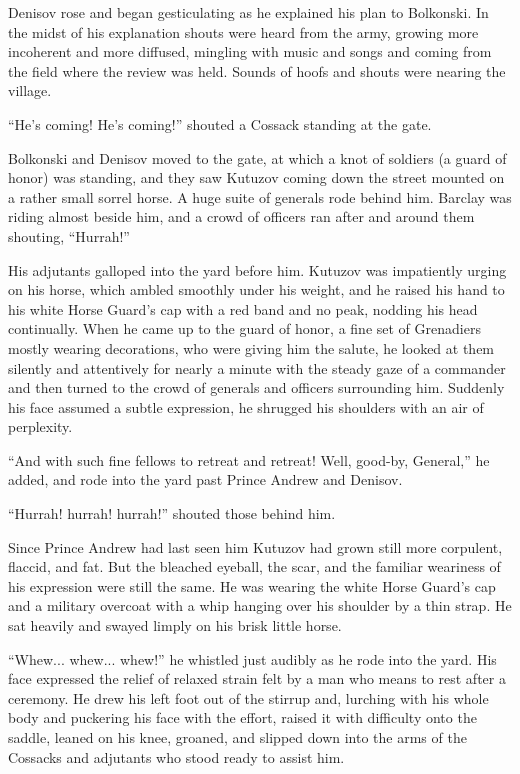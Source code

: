 Denisov rose and began gesticulating as he explained his plan to
Bolkonski. In the midst of his explanation shouts were heard from
the army, growing more incoherent and more diffused, mingling
with music and songs and coming from the field where the review
was held. Sounds of hoofs and shouts were nearing the village.

``He's coming! He's coming!'' shouted a Cossack standing at the
gate.

Bolkonski and Denisov moved to the gate, at which a knot of
soldiers (a guard of honor) was standing, and they saw Kutuzov
coming down the street mounted on a rather small sorrel horse. A
huge suite of generals rode behind him. Barclay was riding almost
beside him, and a crowd of officers ran after and around them
shouting, ``Hurrah!''

His adjutants galloped into the yard before him. Kutuzov was
impatiently urging on his horse, which ambled smoothly under his
weight, and he raised his hand to his white Horse Guard's cap
with a red band and no peak, nodding his head continually. When
he came up to the guard of honor, a fine set of Grenadiers mostly
wearing decorations, who were giving him the salute, he looked at
them silently and attentively for nearly a minute with the steady
gaze of a commander and then turned to the crowd of generals and
officers surrounding him. Suddenly his face assumed a subtle
expression, he shrugged his shoulders with an air of perplexity.

``And with such fine fellows to retreat and retreat! Well,
good-by, General,'' he added, and rode into the yard past Prince
Andrew and Denisov.

``Hurrah! hurrah! hurrah!'' shouted those behind him.

Since Prince Andrew had last seen him Kutuzov had grown still
more corpulent, flaccid, and fat. But the bleached eyeball, the
scar, and the familiar weariness of his expression were still the
same. He was wearing the white Horse Guard's cap and a military
overcoat with a whip hanging over his shoulder by a thin
strap. He sat heavily and swayed limply on his brisk little
horse.

``Whew... whew... whew!'' he whistled just audibly as he rode
into the yard. His face expressed the relief of relaxed strain
felt by a man who means to rest after a ceremony. He drew his
left foot out of the stirrup and, lurching with his whole body
and puckering his face with the effort, raised it with difficulty
onto the saddle, leaned on his knee, groaned, and slipped down
into the arms of the Cossacks and adjutants who stood ready to
assist him.

